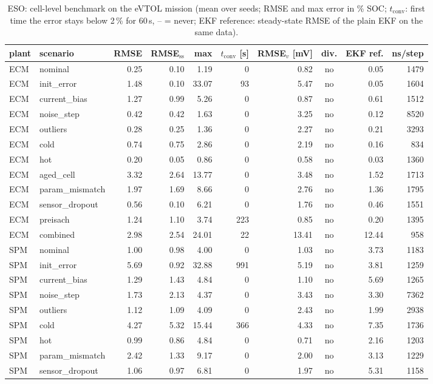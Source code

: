 \begin{table}[H]\centering\footnotesize\setlength{\tabcolsep}{4pt}
\caption{ESO: cell-level benchmark on the eVTOL mission (mean over seeds; RMSE and max error in \% SOC; $t_\mathrm{conv}$: first time the error stays below 2\,\% for 60\,s, -- = never; EKF reference: steady-state RMSE of the plain EKF on the same data).}\label{tab:cell_ESO}
\begin{tabular}{llrrrrrcrr}\toprule
plant & scenario & RMSE & RMSE$_\mathrm{ss}$ & max & $t_\mathrm{conv}$ [s] & RMSE$_v$ [mV] & div. & EKF ref. & ns/step \\ \midrule
ECM & nominal & 0.25 & 0.10 & 1.19 & 0 & 0.82 & no & 0.05 & 1479 \\
ECM & init\_error & 1.48 & 0.10 & 33.07 & 93 & 5.47 & no & 0.05 & 1604 \\
ECM & current\_bias & 1.27 & 0.99 & 5.26 & 0 & 0.87 & no & 0.61 & 1512 \\
ECM & noise\_step & 0.42 & 0.42 & 1.63 & 0 & 3.25 & no & 0.12 & 8520 \\
ECM & outliers & 0.28 & 0.25 & 1.36 & 0 & 2.27 & no & 0.21 & 3293 \\
ECM & cold & 0.74 & 0.75 & 2.86 & 0 & 2.19 & no & 0.16 & 834 \\
ECM & hot & 0.20 & 0.05 & 0.86 & 0 & 0.58 & no & 0.03 & 1360 \\
ECM & aged\_cell & 3.32 & 2.64 & 13.77 & 0 & 3.48 & no & 1.52 & 1713 \\
ECM & param\_mismatch & 1.97 & 1.69 & 8.66 & 0 & 2.76 & no & 1.36 & 1795 \\
ECM & sensor\_dropout & 0.56 & 0.10 & 6.21 & 0 & 1.76 & no & 0.46 & 1551 \\
ECM & preisach & 1.24 & 1.10 & 3.74 & 223 & 0.85 & no & 0.20 & 1395 \\
ECM & combined & 2.98 & 2.54 & 24.01 & 22 & 13.41 & no & 12.44 & 958 \\
\midrule
SPM & nominal & 1.00 & 0.98 & 4.00 & 0 & 1.03 & no & 3.73 & 1183 \\
SPM & init\_error & 5.69 & 0.92 & 32.88 & 991 & 5.19 & no & 3.81 & 1259 \\
SPM & current\_bias & 1.29 & 1.43 & 4.84 & 0 & 1.10 & no & 5.69 & 1265 \\
SPM & noise\_step & 1.73 & 2.13 & 4.37 & 0 & 3.43 & no & 3.30 & 7362 \\
SPM & outliers & 1.12 & 1.09 & 4.09 & 0 & 2.43 & no & 1.99 & 2938 \\
SPM & cold & 4.27 & 5.32 & 15.44 & 366 & 4.33 & no & 7.35 & 1736 \\
SPM & hot & 0.99 & 0.86 & 4.84 & 0 & 0.71 & no & 2.16 & 1203 \\
SPM & param\_mismatch & 2.42 & 1.33 & 9.17 & 0 & 2.00 & no & 3.13 & 1229 \\
SPM & sensor\_dropout & 1.06 & 0.97 & 6.81 & 0 & 1.97 & no & 5.31 & 1158 \\
\bottomrule\end{tabular}\end{table}
